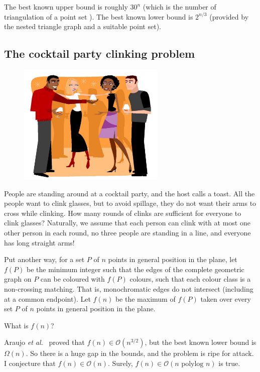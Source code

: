 \documentclass{patmorin}
\newcommand{\poser}[1]{\noindent{\textit{#1}}}
\begin{document}
The best known upper bound is roughly $30^n$ (which is the number of
triangulation of a point set \cite{s12}).  The best known
lower bound is $2^{n/3}$ (provided by the nested triangle graph and a
suitable point set).


\subsection{The cocktail party clinking problem}

\poser{David Wood}

\begin{figure}
\hfill\includegraphics[width=70mm]{party}
\end{figure}
People are standing around at a cocktail party,  and the host calls a
toast. All the people want to clink glasses, but to avoid spillage, they
do not want their arms to cross while clinking. How many rounds of clinks
are sufficient for everyone to clink glasses? Naturally, we assume that
each person can clink with at most one other person in each round, no
three people are standing in a line, and everyone has long straight arms!

Put another way, for a set $P$ of $n$ points in general position in
the plane, let $f(P)$ be the minimum integer such that the edges of the
complete geometric graph on $P$ can be coloured with $f(P)$ colours, such
that each colour class is a non-crossing matching. That is, monochromatic
edges do not intersect (including at a common endpoint). Let $f(n)$ be
the maximum of $f(P)$ taken over every set $P$ of $n$ points in general
position in the plane.

\begin{op}
  What is $f(n)$? 
\end{op}

Araujo \emph{et al.}~\cite{Araujo} proved that
$f(n)\in\mathcal{O}(n^{3/2})$, but the best known lower bound is
$\Omega(n)$. So there is a huge gap in the bounds, and the problem is
ripe for attack. I conjecture that $f(n)\in\mathcal{O}(n)$. Surely,
$f(n)\in\mathcal{O}(n\text{ polylog } n)$ is true.
\end{document}
